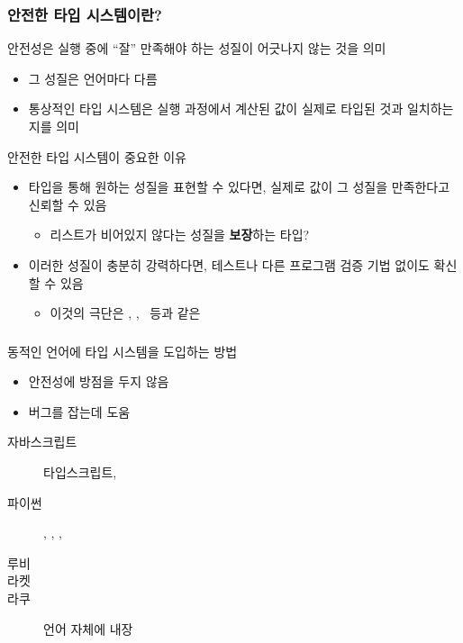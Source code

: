 \documentclass{beamer}
\begin{document}
\begin{frame}[c, fragile]
  \frametitle{안전한 타입 시스템이란?}

  안전성은 실행 중에 ``잘'' 만족해야 하는 성질이 어긋나지 않는 것을 의미
  \begin{itemize}
    \item 그 성질은 언어마다 다름
    \item 통상적인 타입 시스템은 실행 과정에서 계산된 값이 실제로 타입된 것과 일치하는지를 의미
  \end{itemize}
  \pause 안전한 타입 시스템이 중요한 이유
  \begin{itemize}
    \item 타입을 통해 원하는 성질을 표현할 수 있다면, 실제로 값이 그 성질을 만족한다고 신뢰할 수 있음
      \pause\begin{itemize}
        \item 리스트가 비어있지 않다는 성질을 \textbf{보장}하는 타입?
      \end{itemize}
    \pause\item 이러한 성질이 충분히 강력하다면, 테스트나 다른 프로그램 검증 기법 없이도 확신할 수 있음
      \pause\begin{itemize}
        \item 이것의 극단은 , , \ 등과 같은 
      \end{itemize}
  \end{itemize}
\end{frame}


\begin{frame}[c, fragile]
  \frametitle{}

  동적인 언어에 타입 시스템을 도입하는 방법
  \begin{itemize}
    \item 안전성에 방점을 두지 않음
    \item 버그를 잡는데 도움
  \end{itemize}
  \pause\begin{description}
    \item[자바스크립트] 타입스크립트, 
    \item[파이썬] , , , 
    \item[루비] 
    \item[라켓] 
    \item[라쿠] 언어 자체에 내장
  \end{description}
\end{frame}
\end{document}
